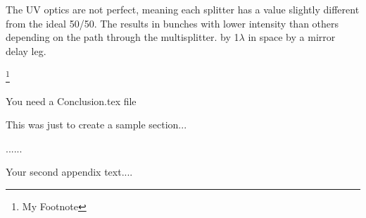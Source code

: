\documentclass{iitthesis}
\begin{document}
The UV optics are not perfect, meaning each splitter has a value slightly different from the ideal 50/50. 
The results in bunches with lower intensity than others depending on the path through the multisplitter.
by 1$\lambda$ in space by a mirror delay leg. 




\footnote{My Footnote} 





%   
You need a Conclusion.tex file



This was just to create a sample section...

\clearpage


%
%
\appendix


......



Your second appendix text....

\newpage
%
%


\end{document}
